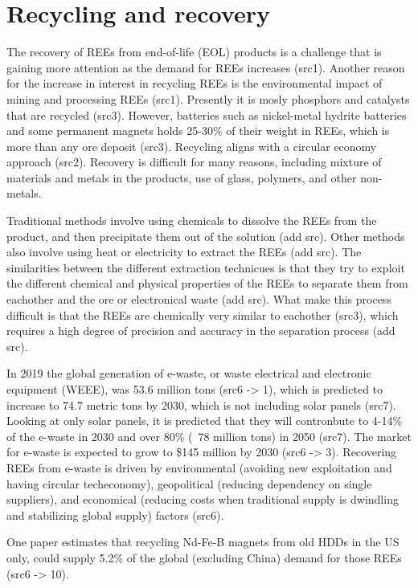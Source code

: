 
\section{Recycling and recovery}

The recovery of REEs from end-of-life (EOL) products is a challenge that is gaining more attention as the demand for REEs increases (src1). Another reason for the increase in interest in recycling REEs is the environmental impact of mining and processing REEs (src1). Presently it is mosly phosphors and catalysts that are recycled (src3). However, batteries such as nickel-metal hydrite batteries and some permanent magnets holds 25-30\% of their weight in REEs, which is more than any ore deposit (src3). Recycling aligns with a circular economy approach (src2). Recovery is difficult for many reasons, including mixture of materials and metals in the products, use of glass, polymers, and other non-metals.

Traditional methods involve using chemicals to dissolve the REEs from the product, and then precipitate them out of the solution (add src). Other methods also involve using heat or electricity to extract the REEs (add src). The similarities between the different extraction technicues is that they try to exploit the different chemical and physical properties of the REEs to separate them from eachother and the ore or electronical waste (add src). What make this process difficult is that the REEs are chemically very similar to eachother (src3), which requires a high degree of precision and accuracy in the separation process (add src).

In 2019 the global generation of e-waste, or waste electrical and electronic equipment (WEEE), was 53.6 million tons (src6 -> 1), which is predicted to increase to 74.7 metric tons by 2030, which is not including solar panels (src7). Looking at only solar panels, it is predicted that they will contronbute to 4-14\% of the e-waste in 2030 and over 80\% (~78 million tons) in 2050 (src7). The market for e-waste is expected to grow to \$145 million by 2030 (src6 -> 3). Recovering REEs from e-waste is driven by environmental (avoiding new exploitation and having circular techeconomy), geopolitical (reducing dependency on single suppliers), and economical (reducing costs when traditional supply is dwindling and stabilizing global supply) factors (src6).

One paper estimates that recycling Nd-Fe-B magnets from old HDDs in the US only, could supply 5.2\% of the global (excluding China) demand for those REEs (src6 -> 10).

